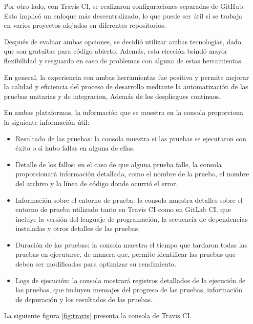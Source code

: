 Por otro lado, con Travis CI, se realizaron configuraciones separadas de GitHub. Esto implicó un enfoque más descentralizado, lo que puede ser útil si se trabaja en varios proyectos alojados en diferentes repositorios.

Después de evaluar ambas opciones, se decidió utilizar ambas tecnologías, dado que son gratuitas para código abierto. Además, esta elección brindó mayor flexibilidad y resguardo en caso de problemas con alguna de estas herramientas.

En general, la experiencia con ambas herramientas fue positiva y permite mejorar la calidad y eficiencia del proceso de desarrollo mediante la automatización de las pruebas unitarias y de integracion, Además de los despliegues continuos.

En ambas plataformas, la información que se muestra en la consola proporciona la siguiente información útil:

\begin{itemize}
	\item Resultado de las pruebas: la consola muestra si las pruebas se ejecutaron con éxito o si hubo fallas en alguna de ellas. 
	
	\item Detalle de los fallos: en el caso de que alguna prueba falle, la consola proporcionará información detallada, como el nombre de la prueba, el nombre del archivo y la línea de código donde ocurrió el error.
	
	\item Información sobre el entorno de prueba: la consola muestra detalles sobre el entorno de prueba utilizado tanto en Travis CI  como en GitLab CI, que incluye la versión del lenguaje de programación, la secuencia de dependencias instaladas y otros detalles de las pruebas.
	
	\item Duración de las pruebas: la consola muestra el tiempo que tardaron todas las pruebas en ejecutarse,  de manera que, permite identificar las pruebas que deben ser modificadas para optimizar su rendimiento.
	
	\item Logs de ejecución: la consola mostrará registros detallados de la ejecución de las pruebas, que incluyen mensajes del progreso de las pruebas, información de depuración y los resultados de las pruebas.
	
\end{itemize}

La siguiente figura \ref{fig:travis} presenta la consola de Travis CI.  

